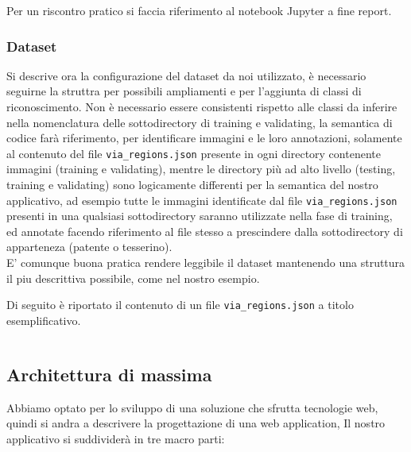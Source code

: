 \documentclass[12pt,a4paper]{article}
\begin{document}
Per un riscontro pratico si faccia riferimento al notebook Jupyter a
fine report.

\subsubsection{Dataset}

Si descrive ora la configurazione del dataset da noi utilizzato, è necessario
seguirne la struttra per possibili ampliamenti e per l'aggiunta di classi
di riconoscimento. Non è necessario essere consistenti rispetto
alle classi da inferire nella nomenclatura delle sottodirectory di
training e validating, la semantica di codice farà riferimento, per
identificare immagini e le loro annotazioni, solamente al contenuto
del file \texttt{via\_regions.json} presente in ogni directory
contenente immagini (training e validating), mentre le directory più ad alto livello (testing,
training e validating) sono logicamente differenti per la semantica del
nostro applicativo, ad esempio tutte le immagini identificate dal file \texttt{via\_regions.json}
presenti in una qualsiasi sottodirectory saranno utilizzate nella fase
di training, ed annotate facendo riferimento al file stesso a
prescindere dalla sottodirectory di apparteneza (patente o tesserino).\\
E' comunque buona pratica rendere leggibile il dataset mantenendo una
struttura il piu descrittiva possibile, come nel nostro esempio.


Di seguito è riportato il contenuto di un file
\texttt{via\_regions.json} a titolo esemplificativo.

\inputminted{json}{via_regions.json}

\subsection{Architettura di massima}

Abbiamo optato per lo sviluppo di una soluzione che sfrutta tecnologie
web, quindi si andra a descrivere la progettazione di una web application, Il nostro
applicativo si suddividerà in tre macro parti:
\end{document}
